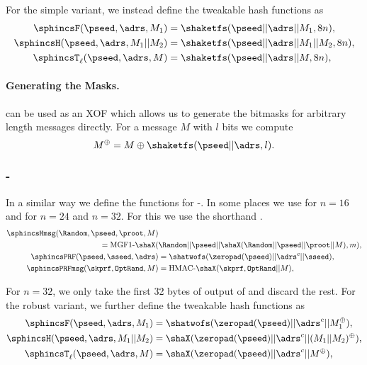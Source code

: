     For the simple variant, we instead define the tweakable hash functions as
    \begin{equation}
      \begin{aligned}
         \sphincsF(\pseed, \adrs, M_1) &= \shaketfs(\pseed || \adrs || M_1, 8n),\\
         \sphincsH(\pseed, \adrs, M_1 || M_2) &= \shaketfs(\pseed || \adrs || M_1 || M_2, 8n),\\
         \sphincsT_\ell(\pseed, \adrs, M) &= \shaketfs(\pseed || \adrs || M, 8n),\\
      \end{aligned}
    \end{equation}

   \paragraph{Generating the Masks.} \shathree can be used as an XOF which
   allows us to generate the bitmasks for arbitrary length messages directly.
   For a message $M$ with $l$ bits we compute
   \begin{equation*}
      M^{\oplus} = M \oplus \shaketfs(\pseed || \adrs, l).
   \end{equation*}

\subsubsection{\spx-\shatwo}
   In a similar way we define the functions for \spx-\shatwo. In some places we use \shatwofs for $n = 16$ and \shatwofivetwelve for $n=24$ and $n=32$. For this we use the shorthand \shaX.
   \begin{equation}
   \begin{aligned}
      \sphincsHmsg(\Random,\pseed, \proot, M) &\\
              = \text{MGF1-}\shaX(&\Random || \pseed || \shaX(\Random || \pseed || \proot || M), m),\\
      \sphincsPRF(\pseed, \sseed, \adrs) &= \shatwofs(\zeropad(\pseed)|| \adrs^{c} || \sseed),\\
      \sphincsPRFmsg(\skprf, \texttt{OptRand}, M) &= \text{HMAC-}\shaX(\skprf, \texttt{OptRand} || M),\\
   \end{aligned}
   \end{equation}

   For $n=32$, we only take the first 32 bytes of output of \sphincsPRF and discard the rest. For the robust variant, we further define the tweakable hash functions as
   \begin{equation}
   \begin{aligned}
      \sphincsF(\pseed, \adrs, M_1) &= \shatwofs(\zeropad(\pseed) || \adrs^{c} || M_1^{\oplus}),\\
      \sphincsH(\pseed, \adrs, M_1 || M_2) &= \shaX(\zeropad(\pseed) || \adrs^{c} || (M_1|| M_2)^{\oplus}),\\
      \sphincsT_\ell(\pseed, \adrs, M) &= \shaX(\zeropad(\pseed) || \adrs^{c} || M^{\oplus}),\\
   \end{aligned}
   \end{equation}

